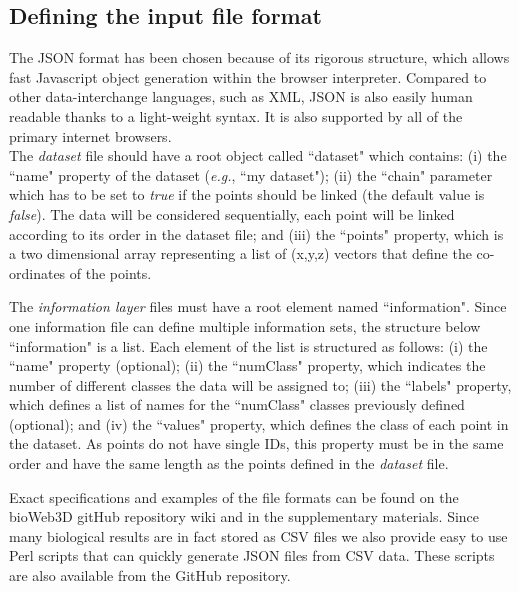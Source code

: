 \documentclass{bioinfo}
\begin{document}
\subsection{Defining the input file format}
The JSON format has been chosen because of its rigorous structure, which allows fast Javascript object generation within the browser interpreter. Compared to other data-interchange languages, such as XML, JSON is also easily human readable thanks to a light-weight syntax. It is also supported by all of the primary internet browsers.\\
The {\it{dataset}} file should have a root object called ``dataset" which contains: (i) the ``name" property of the dataset (\textit{e.g.}, ``my dataset"); (ii) the ``chain" parameter which has to be set to \textit{true} if the points should be linked (the default value is \textit{false}). The data will be considered sequentially, each point will be linked according to its order in the dataset file; and (iii) the ``points" property, which is a two dimensional array representing a list of (x,y,z) vectors that define the co-ordinates of the points.

The {\it{information layer}} files must have a root element named  ``information". Since one information file can define multiple information sets, the structure below ``information" is a list. Each element of the list is structured as follows: (i) the ``name" property (optional); (ii) the ``numClass" property, which indicates the number of different classes the data will be assigned to; (iii) the ``labels" property, which defines a list of names for the ``numClass" classes previously defined (optional); and (iv) the ``values" property, which defines the class of each point in the dataset. As points do not have single IDs, this property must be in the same order and have the same length as the points defined in the {\it{dataset}} file.

Exact specifications and examples of the file formats can be found on the bioWeb3D gitHub repository wiki and in the supplementary materials. Since many biological results are in fact stored as CSV files we also provide easy to use Perl scripts that can quickly generate JSON files from CSV data. These scripts are also available from the GitHub repository.
\end{document}
